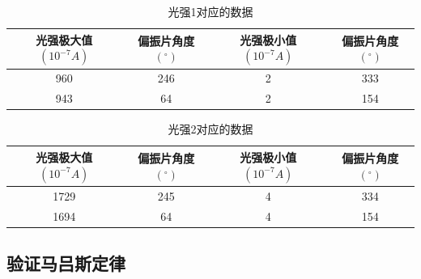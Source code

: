 \documentclass[a4paper,UTF8]{ctexart}
\begin{document}
\begin{table}[htb]
\begin{center}
\begin{tabular}{|c|c|c|c|}
\hline
\bfseries 光强极大值$(10^{-7}A)$ & \bfseries 偏振片角度$(^{\circ})$ & \bfseries 光强极小值$(10^{-7}A)$ & \bfseries 偏振片角度$(^{\circ})$\\
\hline
960                  & 246                  & 2                    & 333                  \\
\hline
943                  & 64                   & 2                    & 154                \\
\hline
\end{tabular}
\end{center}
\caption{光强1对应的数据}
\end{table}

\begin{table}[htb]
\begin{center}
\begin{tabular}{|c|c|c|c|}
\hline
\bfseries 光强极大值$(10^{-7}A)$ & \bfseries 偏振片角度$(^{\circ})$ & \bfseries 光强极小值$(10^{-7}A)$ & \bfseries 偏振片角度$(^{\circ})$\\
\hline
1729                  & 245                  & 4                    & 334                  \\
\hline
1694                  & 64                   & 4                    & 154                \\
\hline
\end{tabular}
\end{center}
\caption{光强2对应的数据}
\end{table}

\subsection{验证马吕斯定律}

\newpage
\end{document}
